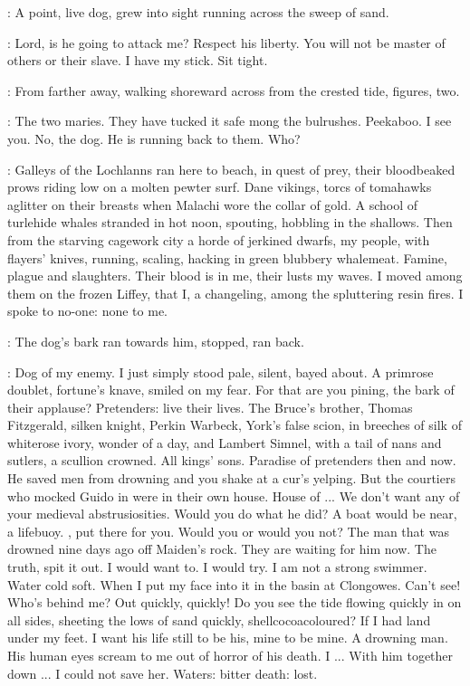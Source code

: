 :
A point, live dog,
grew into sight running across the sweep of sand.

\StephenInt:
Lord, is he going to attack me?
Respect his liberty.
You will not be master of others or their slave.
I have my stick.
Sit tight.

:
From farther away,
walking shoreward across from the crested tide,
figures, two.

\StephenInt:
The two maries.
They have tucked it safe mong the bulrushes.
Peekaboo.
I see you.
No, the dog.
He is running back to them.
Who?

\StephenInt:
Galleys of the Lochlanns ran here to beach,
in quest of prey,
their bloodbeaked prows riding low on a molten pewter surf.
Dane vikings,
torcs of tomahawks aglitter on their breasts
when Malachi wore the collar of gold.
A school of turlehide whales stranded in hot noon, spouting,
hobbling in the shallows.
Then from the starving cagework city
a horde of jerkined dwarfs,
my people, with flayers' knives,
running, scaling, hacking in green blubbery whalemeat.
Famine, plague and slaughters.
Their blood is in me, their lusts my waves.
I moved among them on the frozen Liffey,
that I, a changeling, among the spluttering resin fires.
I spoke to no-one:
none to me.

:
The dog's bark ran towards him, stopped, ran back.

\StephenInt:
Dog of my enemy.
I just simply stood pale, silent, bayed about.
A primrose doublet, fortune's knave, smiled on my fear.
For that are you pining,
the bark of their applause?
Pretenders:
live their lives.
The Bruce's brother,
Thomas Fitzgerald, silken knight,
Perkin Warbeck, York's false scion,
in breeches of silk of whiterose ivory,
wonder of a day,
and Lambert Simnel, with a tail of nans and sutlers, a scullion crowned.
All kings' sons.
Paradise of pretenders then and now.
He saved men from drowning
and you shake at a cur's yelping.
But the courtiers who mocked Guido in 
were in their own house.
House of ...
We don't want any of your medieval abstrusiosities.
Would you do what he did?
A boat would be near, a lifebuoy.
, put there for you.
Would you or would you not?
The man that was drowned nine days ago off Maiden's rock.
They are waiting for him now.
The truth, spit it out.
I would want to.
I would try.
I am not a strong swimmer.
Water cold soft.
When I put my face into it in the basin at Clongowes.
Can't see!
Who's behind me?
Out quickly, quickly!
Do you see the tide flowing quickly in on all sides,
sheeting the lows of sand quickly, shellcocoacoloured?
If I had land under my feet.
I want his life still to be his, mine to be mine.
A drowning man.
His human eyes scream to me out of horror of his death.
I ...
With him together down ...
I could not save her.
Waters:
bitter death:
lost.

